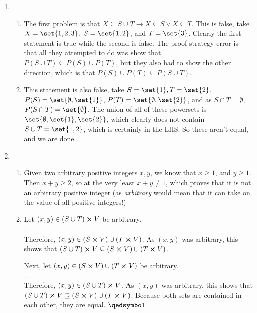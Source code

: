 \documentclass[12pt]{article}
\theoremstyle{definition}
\theoremstyle{remark}
\renewcommand{\qed}{\hfill\qedsymbol}
\newcommand{\ra}{\rightarrow}
\begin{document}
\begin{enumerate}[leftmargin=\labelsep]
		\newpage
		\item 
		\begin{enumerate}
			\item The first problem is that $X \subseteq S \cup T \ra X \subseteq S \lor X \subseteq T$. This is false, take $X = \set{1, 2, 3}$, $S = \set{1, 2}$, and $T = \set{3}$. Clearly the first statement is true while the second is false. The proof strategy error is that all they attempted to do was show that $P(S \cup T) \subseteq P(S) \cup P(T)$, but they also had to show the other direction, which is that $P(S) \cup P(T) \subseteq P(S \cup T)$.
			\item This statement is also false, take $S = \set{1}, T = \set{2}$. $P(S) = \set{\emptyset, \set{1}}$, $P(T) = \set{\emptyset, \set{2}}$, and as $S \cap T = \emptyset$, $P(S \cap T) = \set{\emptyset}$. The union of all of these powersets is $\set{\emptyset, \set{1}, \set{2}}$, which clearly does not contain $S \cup T = \set{1, 2}$, which is certainly in the LHS. So these aren't equal, and we are done.
		\end{enumerate}
	
		\newpage
		\item 
		\begin{enumerate}
			\item Given two arbitrary positive integers $x, y$, we know that $x \geq 1$, and $y \geq 1$. Then $x + y \geq 2$, so at the very least $x + y \neq 1$, which proves that it is not an arbitrary positive integer (as \textit{arbitrary} would mean that it can take on the value of all positive integers!)
			\item Let $(x, y) \in (S \cup T) \cross V$ be arbitrary. \\ ... \\ Therefore, $(x, y) \in (S \cross V) \cup (T \cross V)$. As $(x, y)$ was arbitrary, this shows that $(S \cup T) \cross V \subseteq (S \cross V) \cup (T \cross V)$. 
			
			Next, let $(x, y) \in (S \cross V) \cup (T \cross V)$ be arbitrary. \\ ... \\ Therefore, $(x, y) \in (S \cup T) \cross V$. As $(x, y)$ was arbitrary, this shows that $(S \cup T) \cross V \supseteq (S \cross V) \cup (T \cross V)$. Because both sets are contained in each other, they are equal. $\qed$
		\end{enumerate}
		

\end{enumerate}
\end{document}
